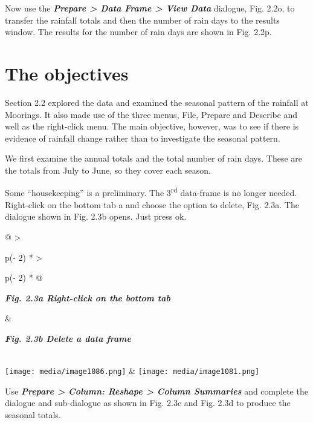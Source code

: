 \documentclass[
  letterpaper,
  DIV=11,
  numbers=noendperiod]{scrreprt}
\begin{document}
Now use the \textbf{\emph{Prepare \textgreater{} Data Frame
\textgreater{} View Data}} dialogue, Fig. 2.2o, to transfer the rainfall
totals and then the number of rain days to the results window. The
results for the number of rain days are shown in Fig. 2.2p.

\section{The objectives}\label{the-objectives}

Section 2.2 explored the data and examined the seasonal pattern of the
rainfall at Moorings. It also made use of the three menus, File, Prepare
and Describe and well as the right-click menu. The main objective,
however, was to see if there is evidence of rainfall change rather than
to investigate the seasonal pattern.

We first examine the annual totals and the total number of rain days.
These are the totals from July to June, so they cover each season.

Some ``housekeeping'' is a preliminary. The 3\textsuperscript{rd}
data-frame is no longer needed. Right-click on the bottom tab a and
choose the option to delete, Fig. 2.3a. The dialogue shown in Fig. 2.3b
opens. Just press ok.

\begin{longtable}[]{@{}
  >{\raggedright\arraybackslash}p{(\columnwidth - 2\tabcolsep) * }
  >{\raggedright\arraybackslash}p{(\columnwidth - 2\tabcolsep) * }@{}}
\toprule\noalign{}
\begin{minipage}[b]{\linewidth}\raggedright
\textbf{\emph{Fig. 2.3a Right-click on the bottom tab}}
\end{minipage} & \begin{minipage}[b]{\linewidth}\raggedright
\textbf{\emph{Fig. 2.3b Delete a data frame}}
\end{minipage} \\
\midrule\noalign{}
\endhead
\bottomrule\noalign{}
\endlastfoot
\texttt{[image: media/image1086.png]}
&
\texttt{[image: media/image1081.png]} \\
\end{longtable}

Use \textbf{\emph{Prepare \textgreater{} Column: Reshape \textgreater{}
Column Summaries}} and complete the dialogue and sub-dialogue as shown
in Fig. 2.3c and Fig. 2.3d to produce the seasonal totals.
\end{document}

